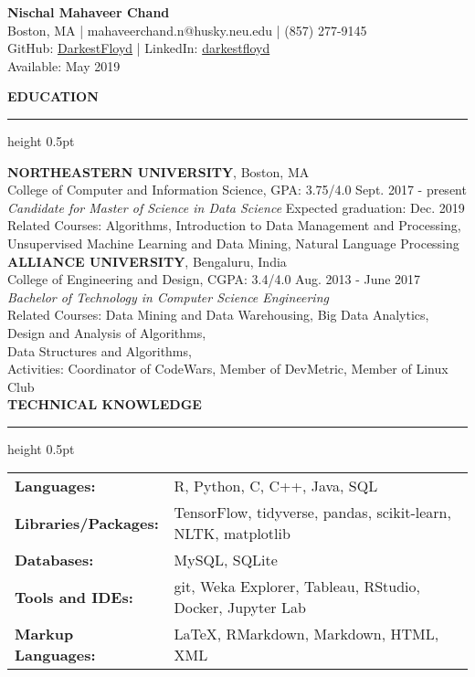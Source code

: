\documentclass[a4paper]{article}
\newcommand{\myline}{\par
  \kern2pt %
  \hrule height 0.5pt
  \kern2pt %
}
\begin{document}
	\begin{center}
		{\Large \textbf{Nischal Mahaveer Chand}} \\
		Boston, MA | mahaveerchand.n@husky.neu.edu | (857) 277-9145 \\
                GitHub: \href{https://github.com/DarkestFloyd}{DarkestFloyd} | 
                LinkedIn: \href{https://www.linkedin.com/in/darkestfloyd}{darkestfloyd} \\
		Available: May 2019 \\
	\end{center}
	
	\noindent
	{\large \textbf{EDUCATION}}
	\myline 
	\smallskip
	
	\noindent
	\textbf{NORTHEASTERN UNIVERSITY}, Boston, MA \\
	College of Computer and Information Science, GPA: 3.75/4.0 
        \hfill Sept. 2017 - present \\
	\textit{Candidate for Master of Science in Data Science} 
        \hfill Expected graduation: Dec. 2019 \\
        Related Courses: Algorithms, Introduction to Data Management and Processing, \\
        \hspace*{23.9mm} Unsupervised Machine Learning and Data Mining, 
        Natural Language Processing \\
	
	\noindent
	\textbf{ALLIANCE UNIVERSITY}, Bengaluru, India \\
	College of Engineering and Design, CGPA: 3.4/4.0 \hfill Aug. 2013 - June 2017 \\
	\textit{Bachelor of Technology in Computer Science Engineering} \\
	Related Courses: 
                                    Data Mining and Data Warehousing,
                                    Big Data Analytics, 
                                    Design and Analysis of Algorithms, 
                                    \\ \hspace*{23.9mm}
                                    Data Structures and Algorithms, 
                                    \\
	Activities: Coordinator of CodeWars, Member of DevMetric, Member of Linux 
        Club \\
	
	\noindent
	{\large \textbf{TECHNICAL KNOWLEDGE}}
	\myline 
	
	\noindent
	\begin{tabular}{ m{3.5cm} l }
		\textbf{Languages: } & R, Python, C, C++, Java, SQL \\ 
		\textbf{Libraries/Packages: } & TensorFlow, tidyverse, pandas, scikit-learn, NLTK, 
                 matplotlib \\
		\textbf{Databases: } & MySQL, SQLite\\
		\textbf{Tools and IDEs: } & git, Weka Explorer, Tableau, RStudio, Docker,
                Jupyter Lab\\
		\textbf{Markup Languages: } & LaTeX, RMarkdown, Markdown, HTML, XML \\
	\end{tabular} \\
\end{document}
